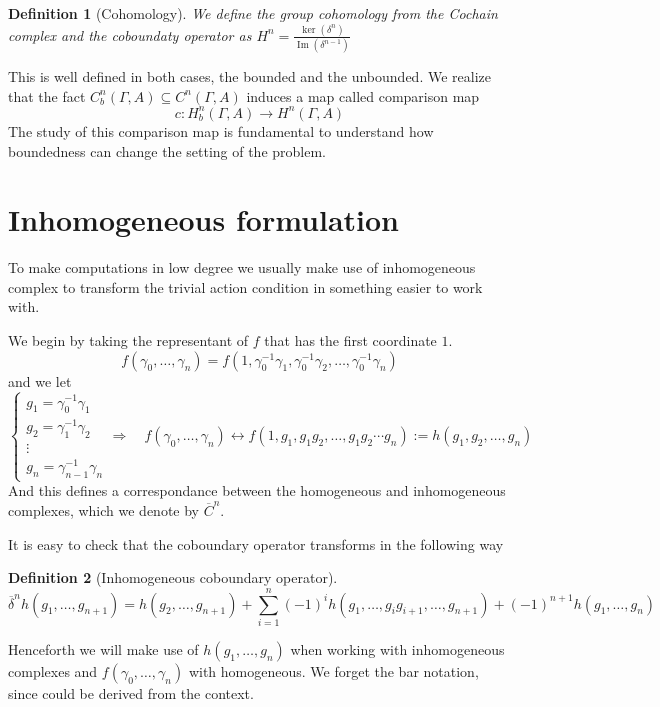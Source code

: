 \documentclass[leqno]{article}
\DeclareMathOperator{\Ima}{Im}
\newtheorem*{definition}{Definition}
\begin{document}
\begin{definition}[Cohomology] We define the group cohomology from the Cochain complex and the coboundaty operator as $\displaystyle H^n = \frac{\ker(\delta^n)}{\Ima(\delta^{n-1})}$
\end{definition}

This is well defined in both cases, the bounded and the unbounded. We realize that the fact $C_b^n(\Gamma , A)\subseteq C^n(\Gamma , A)$ induces a map called comparison map
\[
c: H_b^n(\Gamma , A) \to  H^n(\Gamma , A)
\] 
The study of this comparison map is fundamental to understand how boundedness can change the setting of the problem.

\section{Inhomogeneous formulation}
To make computations in low degree we usually make use of inhomogeneous complex to transform the trivial action condition in something easier to work with.

We begin by taking the representant of $f$ that has the first coordinate  $1$. 
 \[
f(\gamma_0, \ldots, \gamma_n) = f(1, \gamma_0^{-1}\gamma_1, \gamma_0^{-1}\gamma_2, \ldots, \gamma_0^{-1} \gamma_n)
\] 
and we let
\[
\begin{cases}
 g_1 = \gamma_0^{-1}\gamma_1\\
 g_2 = \gamma_1^{-1}\gamma_2\\
 \vdots\\
 g_n = \gamma_{n-1}^{-1} \gamma_n
\end{cases}
\Rightarrow \quad
f(\gamma_0, \ldots, \gamma_n) 
\leftrightarrow f(1, g_1, g_1g_2, \ldots, g_1g_2\cdots g_n) := h(g_1, g_2, \ldots, g_n)
\] 
And this defines a correspondance between the homogeneous and inhomogeneous complexes, which we denote by $\overline{C}^n$.

It is easy to check that the coboundary operator transforms in the following way 
\begin{definition}[Inhomogeneous coboundary operator]
  \[
	\overline{\delta}^nh(g_1, \ldots, g_{n+1}) = h(g_2, \ldots, g_{n+1}) + \sum_{i=1}^n (-1)^ih(g_1, \ldots, g_ig_{i+1}, \ldots, g_{n+1}) + (-1)^{n+1}h(g_1, \ldots, g_n)
  \] 
\end{definition}

Henceforth we will make use of $h(g_1, \ldots, g_n)$ when working with inhomogeneous complexes and $f(\gamma_0, \ldots, \gamma_n)$ with homogeneous. We forget the bar notation, since could be derived from the context.
\end{document}

